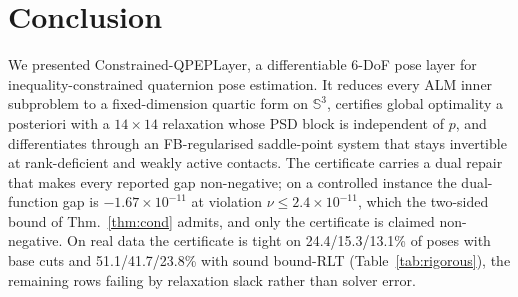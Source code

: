 \section{Conclusion}\label{sec:conclusion}
We presented Constrained-QPEPLayer, a differentiable 6-DoF pose layer for inequality-constrained quaternion pose estimation. It reduces every ALM inner subproblem to a fixed-dimension quartic form on $\mathbb{S}^3$, certifies global optimality a posteriori with a $14\times14$ relaxation whose PSD block is independent of $p$, and differentiates through an FB-regularised saddle-point system that stays invertible at rank-deficient and weakly active contacts. The certificate carries a dual repair that makes every reported gap non-negative; on a controlled instance the dual-function gap is $-1.67\times10^{-11}$ at violation $\nu\le2.4\times10^{-11}$, which the two-sided bound of Thm.~\ref{thm:cond} admits, and only the certificate is claimed non-negative. On real data the certificate is tight on 24.4/15.3/13.1\% of poses with base cuts and 51.1/41.7/23.8\% with sound bound-RLT (Table~\ref{tab:rigorous}), the remaining rows failing by relaxation slack rather than solver error.
